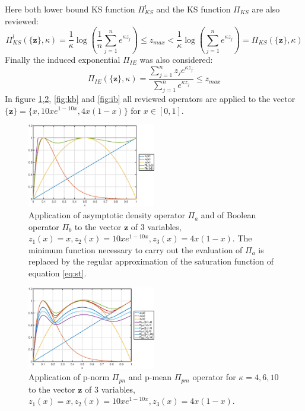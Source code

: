  Here both lower bound KS function $\Pi^l_{KS}$ and the KS function $\Pi_{KS}$ \cite{kreisselmeier1980systematic} are also reviewed:
\begin{equation}
    \Pi^l_{KS}(\lbrace \mathbf{z}\rbrace,\kappa)=\frac{1}{\kappa}\log{\left(\frac{1}{n}\sum_{j=1}^n e^{\kappa z_j}\right)}\leq z_{max} <\frac{1}{\kappa}\log{\left(\sum_{j=1}^n e^{\kappa z_j}\right)}=\Pi_{KS}(\lbrace \mathbf{z}\rbrace,\kappa)
\end{equation}
Finally the induced exponential $\Pi_{IE}$ \cite{kennedy2015improved} was also considered:
\begin{equation}
     \Pi_{IE}(\lbrace \mathbf{z}\rbrace,\kappa)=\frac{\sum_{j=1}^n z_j e^{\kappa z_j}}{\sum_{j=1}^n e^{\kappa z_j}}\leq z_{max}
\end{equation}
In figure \ref{fig:pbb},\ref{fig:pb}, \ref{fig:kb} and \ref{fig:ib} all reviewed operators are applied to the vector $\lbrace\mathbf{z}\rbrace=\{x,10xe^{1-10x},4x(1-x)\}$ for $x\in[0,1]$.
\begin{figure}[!ht]
\centering
  \includegraphics[width=0.5\textwidth]{images/Ch3/pbbench.eps}
\caption{Application of asymptotic density operator $\Pi_{a}$ and of  Boolean operator $\Pi_{b}$ to the vector $\mathbf{z}$ of 3 variables,$z_1(x)=x,z_2(x)=10xe^{1-10x},z_3(x)=4x(1-x)$. The minimum function necessary to carry out the evaluation of $\Pi_{a}$ is replaced by the regular approximation of the saturation function of equation \eqref{eq:st}. }
\label{fig:pbb}       %
\end{figure}
\begin{figure}[!ht]
\centering
  \includegraphics[width=0.5\textwidth]{images/Ch3/pmpnbench.eps}
\caption{Application of p-norm $\Pi_{pn}$ and p-mean $\Pi_{pm}$ operator for $\kappa=4,6,10$ to the vector $\mathbf{z}$ of 3 variables,$z_1(x)=x,z_2(x)=10xe^{1-10x},z_3(x)=4x(1-x)$.}
\label{fig:pb}       %
\end{figure}
